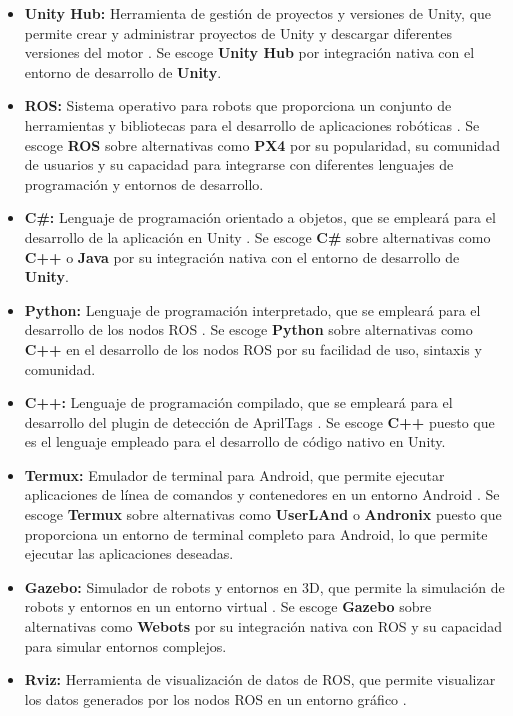 \begin{itemize}
    \item \textbf{Unity Hub:} Herramienta de gestión de proyectos y versiones de Unity, que permite crear y administrar proyectos de Unity y descargar diferentes versiones del motor \parencite{unityUnityUnity}.
    Se escoge \textbf{Unity Hub} por integración nativa con el entorno de desarrollo de \textbf{Unity}.
    \item \textbf{ROS:} Sistema operativo para robots que proporciona un conjunto de herramientas y bibliotecas para el desarrollo de aplicaciones robóticas \parencite{rosROSHome}.
    Se escoge \textbf{ROS} sobre alternativas como \textbf{PX4} por su popularidad, su comunidad de usuarios y su capacidad para integrarse con diferentes lenguajes de programación y entornos de desarrollo.
    \item \textbf{C\#:} Lenguaje de programación orientado a objetos, que se empleará para el desarrollo de la aplicación en Unity \parencite{microsoftLenguajeProgramacin}.
    Se escoge \textbf{C\#} sobre alternativas como \textbf{C++} o \textbf{Java} por su integración nativa con el entorno de desarrollo de \textbf{Unity}.
    \item \textbf{Python:} Lenguaje de programación interpretado, que se empleará para el desarrollo de los nodos ROS \parencite{pythonGeneralPython}.
    Se escoge \textbf{Python} sobre alternativas como \textbf{C++} en el desarrollo de los nodos ROS por su facilidad de uso, sintaxis y comunidad.
    \item \textbf{C++:} Lenguaje de programación compilado, que se empleará para el desarrollo del plugin de detección de AprilTags \parencite{microsoftBienvenidoNuevo}.
    Se escoge \textbf{C++} puesto que es el lenguaje empleado para el desarrollo de código nativo en Unity.
    \item \textbf{Termux:} Emulador de terminal para Android, que permite ejecutar aplicaciones de línea de comandos y contenedores en un entorno Android \parencite{termuxTermux}.
    Se escoge \textbf{Termux} sobre alternativas como \textbf{UserLAnd} o \textbf{Andronix} puesto que proporciona un entorno de terminal completo para Android, lo que permite ejecutar las aplicaciones deseadas.
    \item \textbf{Gazebo:} Simulador de robots y entornos en 3D, que permite la simulación de robots y entornos en un entorno virtual \parencite{gazebo}.
    Se escoge \textbf{Gazebo} sobre alternativas como \textbf{Webots} por su integración nativa con ROS y su capacidad para simular entornos complejos.
    \item \textbf{Rviz:} Herramienta de visualización de datos de ROS, que permite visualizar los datos generados por los nodos ROS en un entorno gráfico \parencite{rosMakingSure}.

\end{itemize}
